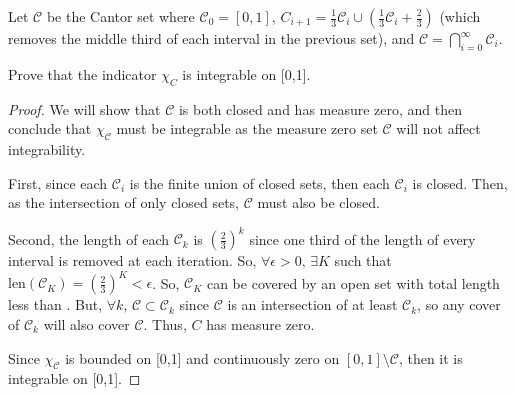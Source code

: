 \documentclass[../hw7]{subfiles}
\begin{document}
\begin{problem}[2]
Let $\mathcal{C}$ be the Cantor set where $\mathcal{C}_0=[0,1]$, $C_{i + 1} = \frac{1}{3}\mathcal{C}_i \cup \left( \frac{1}{3} \mathcal{C}_i + \frac{2}{3}\right)$ (which removes the middle third of each interval in the previous set), and $\mathcal{C}=\bigcap_{i=0}^{\infty} \mathcal{C}_i$.

Prove that the indicator $\chi_C$ is integrable on [0,1].
\end{problem}
\begin{proof}
	We will show that $\mathcal{C}$ is both closed and has measure zero, and then conclude that $\chi_{\mathcal{C}}$ must be integrable as the measure zero set $\mathcal{C}$ will not affect integrability.

	First, since each $\mathcal{C}_i$ is the finite union of closed sets, then each $\mathcal{C}_i$ is closed.
	Then, as the intersection of only closed sets,  $\mathcal{C}$ must also be closed.

	Second, the length of each $\mathcal{C}_k$ is ${\left( \frac{2}{3} \right)}^k$ since one third of the length of every interval is removed at each iteration.
	So, $\forall \epsilon>0,\, \exists K$ such that $\text{len}(\mathcal{C}_K)={\left( \frac{2}{3} \right) }^K<\epsilon$.
	So, $\mathcal{C}_K$ can be covered by an open set with total length less than \epsilon.
	But, $\forall k,\, \mathcal{C}\subset \mathcal{C}_k$ since $\mathcal{C}$ is an intersection of at least $\mathcal{C}_k$,
	so any cover of $\mathcal{C}_k$ will also cover  $\mathcal{C}$.
	Thus, $C$ has measure zero.


	Since $\chi_{\mathcal{C}}$ is bounded on [0,1] and continuously zero on $[0,1]\setminus \mathcal{C}$, then it is integrable on [0,1].
\end{proof}
\end{document}
